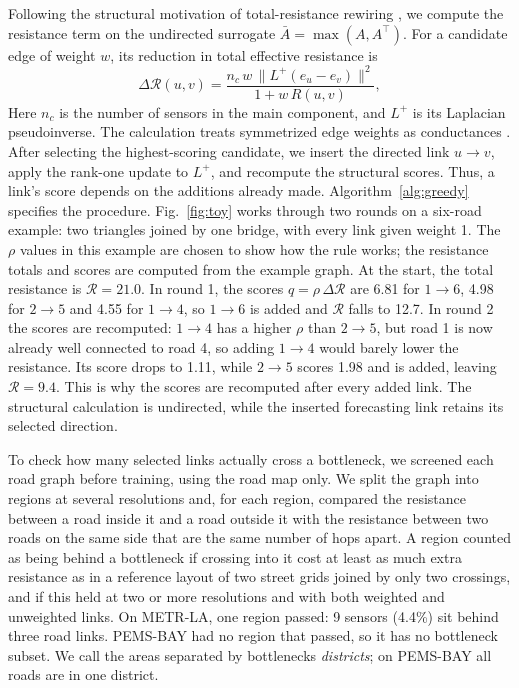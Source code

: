 \documentclass[journal]{IEEEtran}
\begin{document}
Following the structural motivation of total-resistance rewiring \cite{black2023resistance}, we compute the resistance term on the undirected surrogate $\bar A=\max(A,A^\top)$. For a candidate edge of weight $w$, its reduction in total effective resistance is
\begin{equation}
\Delta\mathcal{R}(u,v)=\frac{n_c\,w\,\lVert L^{+}(e_u-e_v)\rVert^2}{1+w\,R(u,v)},
\label{eq:dR}
\end{equation}
Here $n_c$ is the number of sensors in the main component, and $L^+$ is its Laplacian pseudoinverse. The calculation treats symmetrized edge weights as conductances \cite{spielman2011sparsification}. After selecting the highest-scoring candidate, we insert the directed link $u\to v$, apply the rank-one update to $L^+$, and recompute the structural scores. Thus, a link's score depends on the additions already made. Algorithm~\ref{alg:greedy} specifies the procedure. Fig.~\ref{fig:toy} works through two rounds on a six-road example: two triangles joined by one bridge, with every link given weight 1. The $\rho$ values in this example are chosen to show how the rule works; the resistance totals and scores are computed from the example graph. At the start, the total resistance is $\mathcal{R}=21.0$. In round 1, the scores $q=\rho\,\Delta\mathcal{R}$ are 6.81 for $1\to6$, 4.98 for $2\to5$ and 4.55 for $1\to4$, so $1\to6$ is added and $\mathcal{R}$ falls to 12.7. In round 2 the scores are recomputed: $1\to4$ has a higher $\rho$ than $2\to5$, but road 1 is now already well connected to road 4, so adding $1\to4$ would barely lower the resistance. Its score drops to 1.11, while $2\to5$ scores 1.98 and is added, leaving $\mathcal{R}=9.4$. This is why the scores are recomputed after every added link. The structural calculation is undirected, while the inserted forecasting link retains its selected direction.

To check how many selected links actually cross a bottleneck, we screened each road graph before training, using the road map only. We split the graph into regions at several resolutions and, for each region, compared the resistance between a road inside it and a road outside it with the resistance between two roads on the same side that are the same number of hops apart. A region counted as being behind a bottleneck if crossing into it cost at least as much extra resistance as in a reference layout of two street grids joined by only two crossings, and if this held at two or more resolutions and with both weighted and unweighted links. On METR-LA, one region passed: 9 sensors (4.4\%) sit behind three road links. PEMS-BAY had no region that passed, so it has no bottleneck subset. We call the areas separated by bottlenecks \emph{districts}; on PEMS-BAY all roads are in one district.
\end{document}
